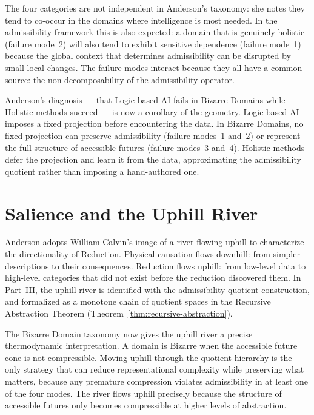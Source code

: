 \documentclass[12pt, a4paper, oneside]{book}
\begin{document}
\begin{remark}
The four categories are not independent in Anderson's taxonomy: she
notes they tend to co-occur in the domains where intelligence is most
needed. In the admissibility framework this is also expected: a domain
that is genuinely holistic (failure mode~2) will also tend to exhibit
sensitive dependence (failure mode~1) because the global context that
determines admissibility can be disrupted by small local changes.
The failure modes interact because they all have a common source:
the non-decomposability of the admissibility operator.

Anderson's diagnosis --- that Logic-based AI fails in Bizarre Domains
while Holistic methods succeed --- is now a corollary of the geometry.
Logic-based AI imposes a fixed projection before encountering the data.
In Bizarre Domains, no fixed projection can preserve admissibility
(failure modes~1 and~2) or represent the full structure of accessible
futures (failure modes~3 and~4). Holistic methods defer the projection
and learn it from the data, approximating the admissibility quotient
rather than imposing a hand-authored one.
\end{remark}

\section{Salience and the Uphill River}

Anderson adopts William Calvin's image of a river flowing uphill to
characterize the directionality of Reduction. Physical causation flows
downhill: from simpler descriptions to their consequences. Reduction flows
uphill: from low-level data to high-level categories that did not exist
before the reduction discovered them. In Part~III, the uphill river is
identified with the admissibility quotient construction, and formalized
as a monotone chain of quotient spaces in the Recursive Abstraction
Theorem (Theorem~\ref{thm:recursive-abstraction}).

The Bizarre Domain taxonomy now gives the uphill river a precise
thermodynamic interpretation. A domain is Bizarre when the accessible
future cone is not compressible. Moving uphill through the quotient
hierarchy is the only strategy that can reduce representational
complexity while preserving what matters, because any premature
compression violates admissibility in at least one of the four modes.
The river flows uphill precisely because the structure of accessible
futures only becomes compressible at higher levels of abstraction.
\end{document}
